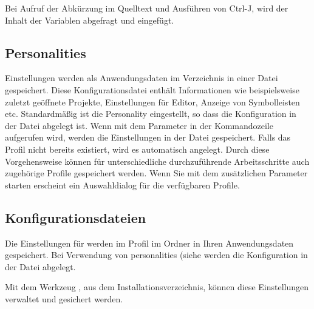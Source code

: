 
Bei Aufruf der Abkürzung  im Quelltext und Ausführen von Ctrl-J, wird der Inhalt der Variablen abgefragt und eingefügt.


\subsection{Personalities}\label{sec:personalities}

\codeblocks Einstellungen werden als Anwendungsdaten im Verzeichnis  in einer Datei  gespeichert. Diese Konfigurationsdatei enthält Informationen wie beispielsweise zuletzt geöffnete Projekte, Einstellungen für Editor, Anzeige von Symbolleisten etc. Standardmäßig ist die Personality  eingestellt, so dass die Konfiguration in der Datei  abgelegt ist. Wenn \codeblocks mit dem Parameter  in der Kommandozeile aufgerufen wird, werden die Einstellungen in der Datei  gespeichert. Falls das Profil nicht bereits existiert, wird es automatisch angelegt. Durch diese Vorgehensweise können für unterschiedliche durchzuführende Arbeitsschritte auch zugehörige Profile gespeichert werden. Wenn Sie \codeblocks mit dem zusätzlichen Parameter  starten erscheint ein Auswahldialog für die verfügbaren Profile.


\subsection{Konfigurationsdateien}

Die Einstellungen für \codeblocks werden im Profil  im Ordner  in Ihren Anwendungsdaten gespeichert. Bei Verwendung von personalities (siehe  werden die Konfiguration in der Datei  abgelegt.

Mit dem Werkzeug , aus dem \codeblocks Installationsverzeichnis, können diese Einstellungen verwaltet und gesichert werden.

